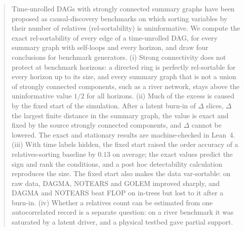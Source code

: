 \documentclass{article}
\theoremstyle{plain}
\theoremstyle{definition}
\theoremstyle{remark}
\begin{document}

\printAffiliationsAndNotice{}

\begin{abstract}
Time-unrolled DAGs with strongly connected summary graphs have been proposed
as causal-discovery benchmarks on which sorting variables by their number of
relatives (rel-sortability) is uninformative. We compute the exact
rel-sortability of every edge of a time-unrolled DAG, for every summary graph
with self-loops and every horizon, and draw four conclusions for benchmark
generators. (i) Strong connectivity does not protect at benchmark horizons: a
directed ring is perfectly rel-sortable for every horizon up to its size, and
every summary graph that is not a union of strongly connected components,
such as a river network, stays above the uninformative value $1/2$ for all
horizons. (ii) Much of the
excess is caused by the fixed start of the simulation. After a latent burn-in
of $\Delta$ slices, $\Delta$ the largest finite distance in the summary graph,
the value is exact and fixed by the source strongly connected components, and
$\Delta$ cannot be lowered. The exact and stationary results are
machine-checked in Lean~4. (iii) With time labels hidden, the fixed start
raised the order accuracy of a relatives-sorting baseline by $0.13$ on average; the exact
values predict the sign and rank the conditions, and a post hoc detectability
calculation reproduces the size. The fixed start also makes the data
var-sortable: on raw data, DAGMA, NOTEARS and GOLEM improved sharply, and DAGMA
and NOTEARS beat FLOP on in-trees but lost to it after a burn-in. (iv) Whether
a relatives count can be estimated from one autocorrelated record is a
separate question: on a river benchmark it was saturated by a latent driver,
and a physical testbed gave partial support.
\end{abstract}

\end{document}
